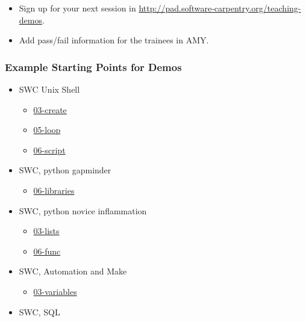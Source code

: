 \begin{itemize}
\itemsep1pt\parskip0pt
\item
  Sign up for your next session in
  \url{http://pad.software-carpentry.org/teaching-demos}.
\item
  Add pass/fail information for the trainees in AMY.
\end{itemize}

\subsubsection{Example Starting Points for
Demos}\label{example-starting-points-for-demos}

\begin{itemize}
\itemsep1pt\parskip0pt
\item
  SWC Unix Shell

  \begin{itemize}
  \itemsep1pt\parskip0pt
  \item
    \href{\{\{\%20site.swc\_pages\%20\}\}/shell-novice/03-create/}{03-create}
  \item
    \href{\{\{\%20site.swc\_pages\%20\}\}/shell-novice/05-loop/}{05-loop}
  \item
    \href{\{\{\%20site.swc\_pages\%20\}\}/shell-novice/06-script/}{06-script}
  \end{itemize}
\item
  SWC, python gapminder

  \begin{itemize}
  \itemsep1pt\parskip0pt
  \item
    \href{\{\{\%20site.swc\_pages\%20\}\}/python-novice-gapminder/06-libraries/}{06-libraries}
  \end{itemize}
\item
  SWC, python novice inflammation

  \begin{itemize}
  \itemsep1pt\parskip0pt
  \item
    \href{\{\{\%20site.swc\_pages\%20\}\}/python-novice-inflammation/03-lists/}{03-lists}
  \item
    \href{\{\{\%20site.swc\_pages\%20\}\}/python-novice-inflammation/06-func/}{06-func}
  \end{itemize}
\item
  SWC, Automation and Make

  \begin{itemize}
  \itemsep1pt\parskip0pt
  \item
    \href{\{\{\%20site.swc\_pages\%20\}\}/make-novice/03-variables/}{03-variables}
  \end{itemize}
\item
  SWC, SQL


\end{itemize}
